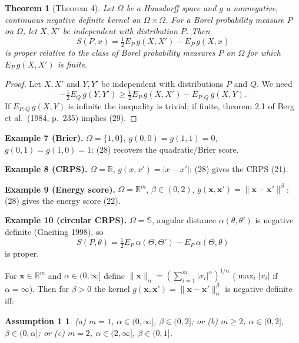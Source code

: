 \documentclass{article}
\newtheorem{theorem}{Theorem}
\newtheorem*{assumption}{Assumption 1}
\newcommand{\1}{\mathbb{1}}
\newcommand{\R}{\mathbb{R}}
\newcommand{\bx}{\mathbf{x}}
\begin{document}
\begin{theorem}[Theorem 4]
Let $\Omega$ be a Hausdorff space and $g$ a nonnegative, continuous negative
definite kernel on $\Omega\times\Omega$. For a Borel probability measure $P$ on
$\Omega$, let $X,X'$ be independent with distribution $P$. Then
\begin{equation}\tag{28}
  S(P,x) = \tfrac12 E_P\, g(X,X') - E_P\, g(X,x)
\end{equation}
is proper relative to the class of Borel probability measures $P$ on $\Omega$
for which $E_P\, g(X,X')$ is finite.
\end{theorem}
\begin{proof}
Let $X,X'$ and $Y,Y'$ be independent with distributions $P$ and $Q$. We need
\begin{equation}\tag{29}
  -\tfrac12 E_Q\, g(Y,Y') \ge \tfrac12 E_P\, g(X,X') - E_{P,Q}\, g(X,Y).
\end{equation}
If $E_{P,Q}\,g(X,Y)$ is infinite the inequality is trivial; if finite, theorem
2.1 of Berg et al.\ (1984, p.~235) implies (29).
\end{proof}

\noindent\textbf{Example 7 (Brier).} $\Omega=\{1,0\}$, $g(0,0)=g(1,1)=0$,
$g(0,1)=g(1,0)=1$: (28) recovers the quadratic/Brier score.

\noindent\textbf{Example 8 (CRPS).} $\Omega=\R$, $g(x,x')=|x-x'|$: (28) gives
the CRPS (21).

\noindent\textbf{Example 9 (Energy score).} $\Omega=\R^m$, $\beta\in(0,2)$,
$g(\bx,\bx')=\|\bx-\bx'\|^\beta$: (28) gives the energy score (22).

\noindent\textbf{Example 10 (circular CRPS).} $\Omega=\mathbb{S}$, angular
distance $\alpha(\theta,\theta')$ is negative definite (Gneiting 1998), so
\begin{equation}\tag{30}
  S(P,\theta) = \tfrac12 E_P\,\alpha(\Theta,\Theta') - E_P\,\alpha(\Theta,\theta)
\end{equation}
is proper.

For $\bx\in\R^m$ and $\alpha\in(0,\infty]$ define
$\|\bx\|_\alpha = (\sum_{i=1}^m|x_i|^\alpha)^{1/\alpha}$ ($\max_i|x_i|$ if
$\alpha=\infty$). Then for $\beta>0$ the kernel $g(\bx,\bx')=\|\bx-\bx'\|_\alpha^\beta$
is negative definite iff:

\begin{assumption}
(a) $m=1$, $\alpha\in(0,\infty]$, $\beta\in(0,2]$; or (b) $m\ge2$,
$\alpha\in(0,2]$, $\beta\in(0,\alpha]$; or (c) $m=2$, $\alpha\in(2,\infty]$,
$\beta\in(0,1]$.
\end{assumption}
\end{document}
